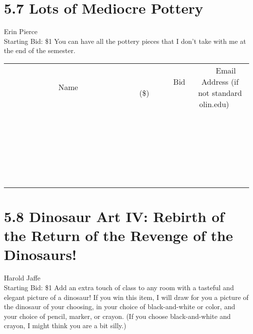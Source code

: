\documentclass[11pt]{article}
\begin{document}
\section*{5.7 Lots of Mediocre Pottery}
Erin Pierce
\\
Starting Bid: \$1
\newline
You can have all the pottery pieces that I don't take with me at the end of the semester.
\\[6ex]
\begin{tabular}{c c c}
~~~~~~~~~~~~~Name~~~~~~~~~~~~~ & ~~~~~~~~~Bid (\$)~~~~~~~~~  & ~~~Email Address (if not standard olin.edu)~~~\\
 & & \\
\hline
 & & \\
\hline
 & & \\
\hline
 & & \\
\hline
 & & \\
\hline
 & & \\
\hline
 & & \\
\hline
 & & \\
\hline
 & & \\
\hline
 & & \\
\hline
 & & \\
\hline
 & & \\
\hline
 & & \\
\hline
 & & \\
\hline
 & & \\
\hline
 & & \\
\hline
 & & \\
\hline
 & & \\
\hline
 & & \\
\hline
 & & \\
\hline
 & & \\
\hline
 & & \\
\hline
 & & \\
\hline
 & & \\
\hline
 & & \\
\hline
 & & \\
\hline
\end{tabular}
\newpage
\section*{5.8 Dinosaur Art IV: Rebirth of the Return of the Revenge of the Dinosaurs!}
Harold Jaffe
\\
Starting Bid: \$1
\newline
Add an extra touch of class to any room with a tasteful and elegant picture of a dinosaur! If you win this item, I will draw for you a picture of the dinosaur of your choosing, in your choice of black-and-white or color, and your choice of pencil, marker, or crayon. (If you choose black-and-white and crayon, I might think you are a bit silly.)
\end{document}
